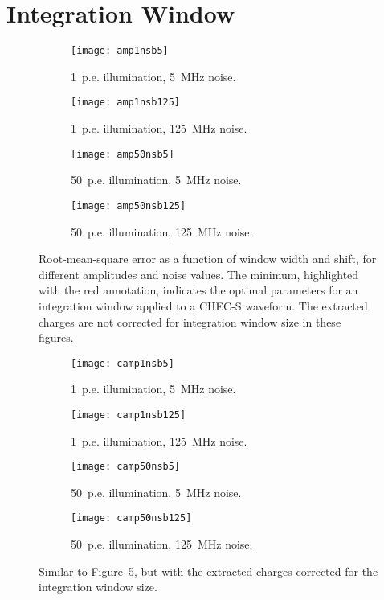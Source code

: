 \section{Integration Window}

\begin{figure}
  \begin{subfigure}[b]{0.49\textwidth}
    \texttt{[image: amp1nsb5]}
    \caption{1~p.e. illumination, 5~MHz noise.}
    \label{fig:amp1nsb5}
  \end{subfigure}
  \hfill
  \begin{subfigure}[b]{0.49\textwidth}
    \texttt{[image: amp1nsb125]}
    \caption{1~p.e. illumination, 125~MHz noise.}
    \label{fig:amp1nsb125}
  \end{subfigure}
  \hfill
  \begin{subfigure}[b]{0.49\textwidth}
    \texttt{[image: amp50nsb5]}
    \caption{50~p.e. illumination, 5~MHz noise.}
    \label{fig:amp50nsb5}
  \end{subfigure}
  \hfill
  \begin{subfigure}[b]{0.49\textwidth}
    \texttt{[image: amp50nsb125]}
    \caption{50~p.e. illumination, 125~MHz noise.}
    \label{fig:amp50nsb125}
  \end{subfigure}
  \caption[Optimal integration window parameters.]{Root-mean-square error as a function of window width and shift, for different amplitudes and noise values. The minimum, highlighted with the red annotation, indicates the optimal parameters for an integration window applied to a CHEC-S waveform. The extracted charges are not corrected for integration window size in these figures.}
  \label{fig:rmse_noc}
\end{figure}

\begin{figure}
  \begin{subfigure}[b]{0.49\textwidth}
    \texttt{[image: camp1nsb5]}
    \caption{1~p.e. illumination, 5~MHz noise.}
    \label{fig:camp1nsb5}
  \end{subfigure}
  \hfill
  \begin{subfigure}[b]{0.49\textwidth}
    \texttt{[image: camp1nsb125]}
    \caption{1~p.e. illumination, 125~MHz noise.}
    \label{fig:camp1nsb125}
  \end{subfigure}
  \hfill
  \begin{subfigure}[b]{0.49\textwidth}
    \texttt{[image: camp50nsb5]}
    \caption{50~p.e. illumination, 5~MHz noise.}
    \label{fig:camp50nsb5}
  \end{subfigure}
  \hfill
  \begin{subfigure}[b]{0.49\textwidth}
    \texttt{[image: camp50nsb125]}
    \caption{50~p.e. illumination, 125~MHz noise.}
    \label{fig:camp50nsb125}
  \end{subfigure}
  \caption[Optimal integration window parameters, with window correction.]{Similar to Figure~\ref{fig:rmse_noc}, but with the extracted charges corrected for the integration window size.}
  \label{fig:rmse_c}
\end{figure}

